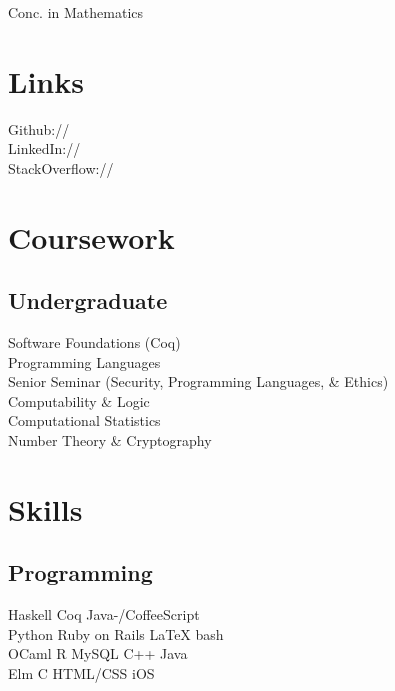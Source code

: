 \documentclass[]{deedy-resume-openfont}
\begin{document}
\begin{minipage}[t]{0.33\textwidth}


  Conc. in Mathematics
  \sectionsep





\section{Links} 
Github:// \href{https://github.com/ericthewry}{} \\
LinkedIn://  \href{https://www.linkedin.com/in/eric-campbell-ba339490/}{} \\
StackOverflow:// \href{https://stackoverflow.com/users/8202530/ericthewry}{}
\sectionsep


\section{Coursework}

\subsection{Undergraduate}
Software Foundations (Coq) \\
Programming Languages \\
Senior Seminar (Security, Programming Languages, \& Ethics) \\
Computability \& Logic \\
Computational Statistics \\
Number Theory \& Cryptography
\sectionsep


\section{Skills}
\subsection{Programming}
Haskell \textbullet{} Coq \textbullet{} Java-/CoffeeScript   \\
Python \textbullet{} Ruby on Rails \textbullet{} \LaTeX \textbullet{} bash \\ 
OCaml \textbullet{} R \textbullet{} MySQL \textbullet{} C++ \textbullet{} Java \\
Elm \textbullet{} C  \textbullet{} HTML/CSS  \textbullet{} iOS
\sectionsep


\end{minipage}
\end{document}
